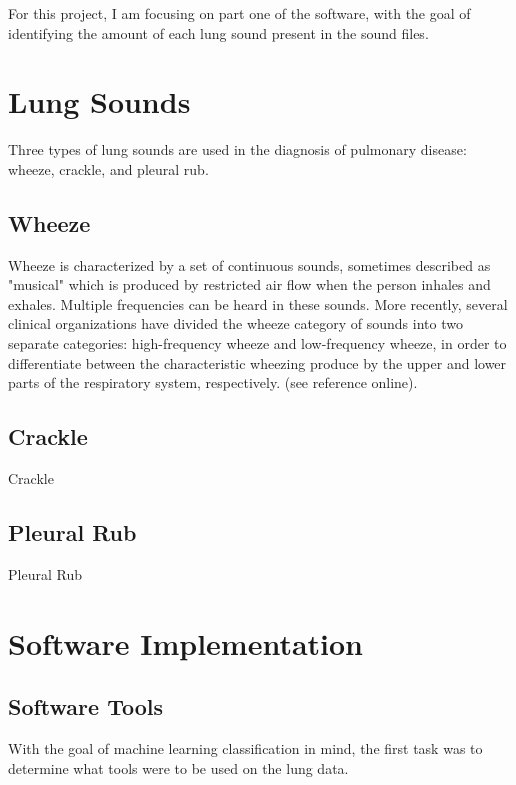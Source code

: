 \documentclass{article}
\begin{document}
  For this project, I am focusing on part one of the software, with the goal of identifying the amount of each lung sound present in the sound files.\\
  
\section{Lung Sounds}

Three types of lung sounds are used in the diagnosis of pulmonary disease: wheeze, crackle, and pleural rub. 

\subsection{Wheeze}

Wheeze is characterized by a set of continuous sounds, sometimes described as "musical" which is produced by restricted air flow when the person inhales and exhales.  Multiple frequencies can be heard in these sounds.  More recently, several clinical organizations have divided the wheeze category of sounds into two separate categories: high-frequency wheeze and low-frequency wheeze, in order to differentiate between the characteristic wheezing produce by the upper and lower parts of the respiratory system, respectively. (see reference online).

\subsection{Crackle}

Crackle

\subsection{Pleural Rub}

Pleural Rub

\newpage

\section{Software Implementation}

\subsection{Software Tools}

 With the goal of machine learning classification in mind, the first task was to determine what tools were to be used on the lung data. \\
 
\end{document}
